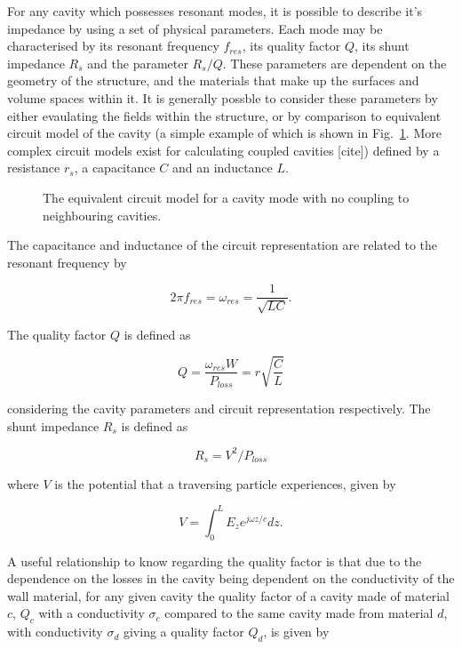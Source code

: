 \label{app:ferrProp}

For any cavity which possesses resonant modes, it is possible to describe it's impedance by using a set of physical parameters. Each mode may be characterised by its resonant frequency $f_{res}$, its quality factor $Q$, its shunt impedance $R_{s}$ and the parameter $R_{s}/Q$. These parameters are dependent on the geometry of the structure, and the materials that make up the surfaces and volume spaces within it. It is generally possble to consider these parameters by either evaulating the fields within the structure, or by comparison to equivalent circuit model of the cavity (a simple example of which is shown in Fig.~\ref{fig:cavCircuitModel}. More complex circuit models exist for calculating coupled cavities [cite]) defined by a resistance $r_{s}$, a capacitance $C$ and an inductance $L$.

\begin{figure}
\caption{The equivalent circuit model for a cavity mode with no coupling to neighbouring cavities.}
\label{fig:cavCircuitModel}
\end{figure}

The capacitance and inductance of the circuit representation are related to the resonant frequency by

\begin{equation}
2\pi f_{res} = \omega_{res} = \frac{1}{\sqrt{LC}}.
\end{equation}

The quality factor $Q$ is defined as

\begin{equation}
Q = \frac{\omega_{res}W}{P_{loss}} = r\sqrt{\frac{C}{L}}
\end{equation}

considering the cavity parameters and circuit representation respectively. The shunt impedance $R_{s}$ is defined as

\begin{equation}
R_{s} = V^{2}/P_{loss}
\end{equation}

where $V$ is the potential that a traversing particle experiences, given by

\begin{equation}
V = \int^{L}_{0} E_{z} e^{j\omega z/c} dz.
\end{equation}

A useful relationship to know regarding the quality factor is that due to the dependence on the losses in the cavity being dependent on the conductivity of the wall material, for any given cavity the quality factor of a cavity made of material $c$, $Q_{c}$ with a conductivity $\sigma_{c}$ compared to the same cavity made from material $d$, with conductivity $\sigma_{d}$ giving a quality factor $Q_{d}$, is given by


